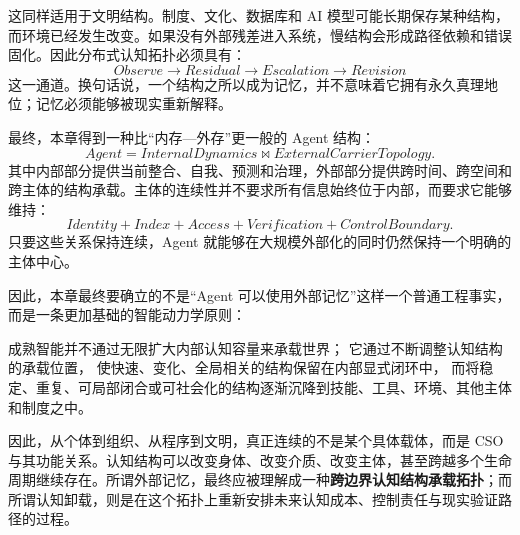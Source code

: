 这同样适用于文明结构。制度、文化、数据库和 AI 模型可能长期保存某种结构，而环境已经发生改变。如果没有外部残差进入系统，慢结构会形成路径依赖和错误固化。因此分布式认知拓扑必须具有：
\[
Observe
\rightarrow
Residual
\rightarrow
Escalation
\rightarrow
Revision
\]
这一通道。换句话说，一个结构之所以成为记忆，并不意味着它拥有永久真理地位；记忆必须能够被现实重新解释。

最终，本章得到一种比``内存—外存''更一般的 Agent 结构：
\[
\boxed{
Agent
=
InternalDynamics
\bowtie
ExternalCarrierTopology.
}
\]
其中内部部分提供当前整合、自我、预测和治理，外部部分提供跨时间、跨空间和跨主体的结构承载。主体的连续性并不要求所有信息始终位于内部，而要求它能够维持：
\[
Identity
+
Index
+
Access
+
Verification
+
ControlBoundary.
\]
只要这些关系保持连续，Agent 就能够在大规模外部化的同时仍然保持一个明确的主体中心。

因此，本章最终要确立的不是``Agent 可以使用外部记忆''这样一个普通工程事实，而是一条更加基础的智能动力学原则：

\begin{proposition*}
成熟智能并不通过无限扩大内部认知容量来承载世界；
它通过不断调整认知结构的承载位置，
使快速、变化、全局相关的结构保留在内部显式闭环中，
而将稳定、重复、可局部闭合或可社会化的结构逐渐沉降到技能、工具、环境、其他主体和制度之中。
\end{proposition*}

因此，从个体到组织、从程序到文明，真正连续的不是某个具体载体，而是 CSO 与其功能关系。认知结构可以改变身体、改变介质、改变主体，甚至跨越多个生命周期继续存在。所谓外部记忆，最终应被理解成一种\textbf{跨边界认知结构承载拓扑}；而所谓认知卸载，则是在这个拓扑上重新安排未来认知成本、控制责任与现实验证路径的过程。
